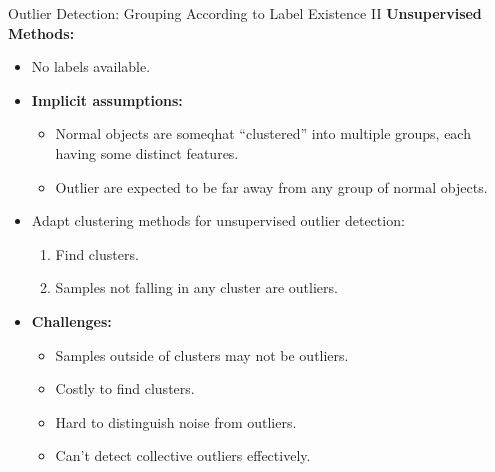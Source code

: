 \begin{frame}{Outlier Detection: Grouping According to Label Existence II}
	\textcolor{faugray}{\textbf{Unsupervised Methods:}}

	\begin{itemize}
		\item No labels available.
		\item \textbf{Implicit assumptions:}
		      \begin{itemize}
			      \item \textcolor{faugray}{Normal objects are someqhat ``clustered''} into multiple groups, each having some distinct features.
			      \item Outlier are expected to be far away from any group of normal objects.
		      \end{itemize}
		\item Adapt clustering methods for unsupervised outlier detection:
		      \begin{enumerate}
			      \item Find clusters.
			      \item Samples not falling in any cluster are outliers.
		      \end{enumerate}
		\item \textbf{Challenges:}
		      \begin{itemize}
			      \item Samples outside of clusters may not be outliers.
			      \item Costly to find clusters.
			      \item Hard to distinguish noise from outliers.
			      \item Can't detect collective outliers effectively.
		      \end{itemize}
	\end{itemize}
\end{frame}


